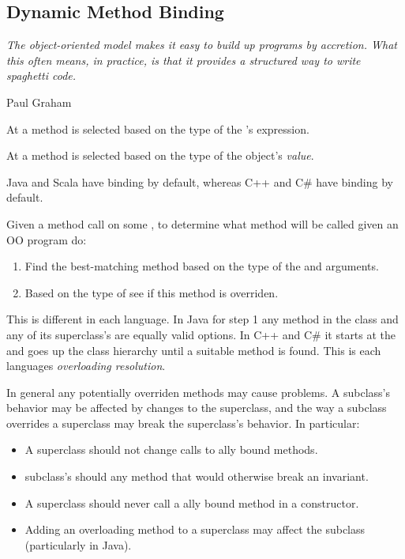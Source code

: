 \documentclass{article}
\begin{document}
\subsection{Dynamic Method Binding}

\epigraph{\itshape The object-oriented model makes it easy to build up programs by accretion. What this often means, in practice, is that it provides a structured way to write spaghetti code.}{Paul Graham}

\begin{definition}
At \compiletime{} a method is selected based on the \textit{\static{}} type of the \receiver{}'s \textit{\syntactic{}} expression.
\end{definition}

\begin{definition}
At \runtime{} a method is selected based on the \textit{\dynamic{}} type of the \receiver{} object's \textit{value}.
\end{definition}

Java and Scala have \dynamic{} binding by default, whereas C++ and C\# have \static{} binding by default.

\begin{definition}
\label{twostep}
Given a method call on some \receiver{},
 to determine what method will be called given an OO program do:
\begin{enumerate}
\item Find the best-matching method based on the \textit{\static{}} type of the \receiver{} and arguments.
\item Based on the \textit{\dynamic{}} type of \receiver{} see if this method is overriden.
\end{enumerate}
This is different in each language. In Java for step 1 any method in the \static{} class and any of its superclass's are equally valid options. In C++ and C\# it starts at the \static{} and goes up the class hierarchy until a suitable method is found.
This is each languages \textit{overloading resolution}.
\end{definition}

\begin{definition}
\label{fragile}
In general any potentially overriden methods may cause problems. A subclass's behavior may be affected by changes to the superclass, and the way a subclass overrides a superclass may break the superclass's behavior. In particular:
\begin{itemize}
\item A superclass should not change calls to \dynamic{}ally bound methods.
\item subclass's should \override{} any method that would otherwise break an invariant.
\item A superclass should never call a \dynamic{}ally bound method in a constructor.
\item Adding an overloading method to a superclass may affect the subclass (particularly in Java).
\end{itemize}
\end{definition}
\end{document}
